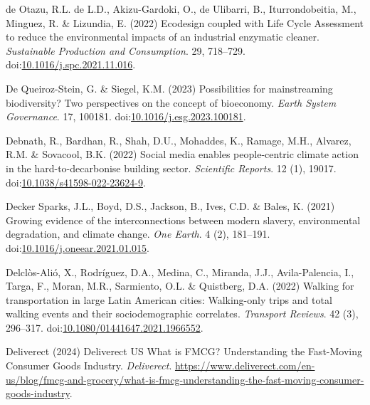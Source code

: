 \documentclass[
  letterpaper,
  DIV=11,
  numbers=noendperiod]{scrartcl}
\newlength{\cslhangindent}
\newenvironment{CSLReferences}[2] %
 {\begin{list}{}{%
  \setlength{\itemindent}{0pt}
  \setlength{\leftmargin}{0pt}
  \setlength{\parsep}{0pt}
  \ifodd #1
   \setlength{\leftmargin}{\cslhangindent}
   \setlength{\itemindent}{-1\cslhangindent}
  \fi
  \setlength{\itemsep}{#2\baselineskip}}}
 {\end{list}}
\begin{document}
\begin{CSLReferences}{0}{1}
de Otazu, R.L. de L.D., Akizu-Gardoki, O., de Ulibarri, B.,
Iturrondobeitia, M., Minguez, R. \& Lizundia, E. (2022) Ecodesign
coupled with {Life Cycle Assessment} to reduce the environmental impacts
of an industrial enzymatic cleaner. \emph{Sustainable Production and
Consumption}. 29, 718--729.
doi:\href{https://doi.org/10.1016/j.spc.2021.11.016}{10.1016/j.spc.2021.11.016}.

De Queiroz-Stein, G. \& Siegel, K.M. (2023) Possibilities for
mainstreaming biodiversity? {Two} perspectives on the concept of
bioeconomy. \emph{Earth System Governance}. 17, 100181.
doi:\href{https://doi.org/10.1016/j.esg.2023.100181}{10.1016/j.esg.2023.100181}.

Debnath, R., Bardhan, R., Shah, D.U., Mohaddes, K., Ramage, M.H.,
Alvarez, R.M. \& Sovacool, B.K. (2022) Social media enables
people-centric climate action in the hard-to-decarbonise building
sector. \emph{Scientific Reports}. 12 (1), 19017.
doi:\href{https://doi.org/10.1038/s41598-022-23624-9}{10.1038/s41598-022-23624-9}.

Decker Sparks, J.L., Boyd, D.S., Jackson, B., Ives, C.D. \& Bales, K.
(2021) Growing evidence of the interconnections between modern slavery,
environmental degradation, and climate change. \emph{One Earth}. 4 (2),
181--191.
doi:\href{https://doi.org/10.1016/j.oneear.2021.01.015}{10.1016/j.oneear.2021.01.015}.

Delclòs-Alió, X., Rodríguez, D.A., Medina, C., Miranda, J.J.,
Avila-Palencia, I., Targa, F., Moran, M.R., Sarmiento, O.L. \&
Quistberg, D.A. (2022) Walking for transportation in large {Latin
American} cities: Walking-only trips and total walking events and their
sociodemographic correlates. \emph{Transport Reviews}. 42 (3), 296--317.
doi:\href{https://doi.org/10.1080/01441647.2021.1966552}{10.1080/01441647.2021.1966552}.

Deliverect (2024) Deliverect {US} {\textbar} {What} is {FMCG}?
{Understanding} the {Fast-Moving Consumer Goods Industry}.
\emph{Deliverect}.
\url{https://www.deliverect.com/en-us/blog/fmcg-and-grocery/what-is-fmcg-understanding-the-fast-moving-consumer-goods-industry}.


\end{CSLReferences}
\end{document}
